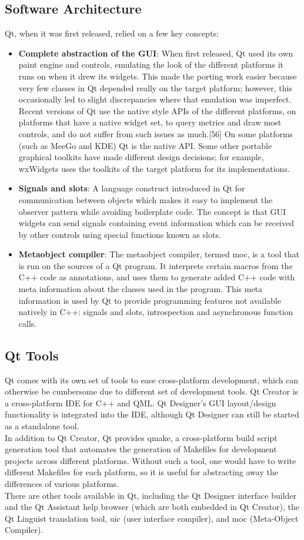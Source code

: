 \subsection{Software Architecture}
Qt, when it was first released, relied on a few key concepts:\\
\begin{itemize}
	\item \textbf{Complete abstraction of the GUI}: When first released, Qt used its own paint engine and controls, emulating the look of the different platforms it runs on when it drew its widgets. This made the porting work easier because very few classes in Qt depended really on the target platform; however, this occasionally led to slight discrepancies where that emulation was imperfect. Recent versions of Qt use the native style APIs of the different platforms, on platforms that have a native widget set, to query metrics and draw most controls, and do not suffer from such issues as much.[56] On some platforms (such as MeeGo and KDE) Qt is the native API. Some other portable graphical toolkits have made different design decisions; for example, wxWidgets uses the toolkits of the target platform for its implementations.
	\item \textbf{Signals and slots}: A language construct introduced in Qt for communication between objects which makes it easy to implement the observer pattern while avoiding boilerplate code. The concept is that GUI widgets can send signals containing event information which can be received by other controls using special functions known as slots.
	\item \textbf{Metaobject compiler}: The metaobject compiler, termed moc, is a tool that is run on the sources of a Qt program. It interprets certain macros from the C++ code as annotations, and uses them to generate added C++ code with meta information about the classes used in the program. This meta information is used by Qt to provide programming features not available natively in C++: signals and slots, introspection and asynchronous function calls.
\end{itemize}
\subsection{Qt Tools}
Qt comes with its own set of tools to ease cross-platform development, which can otherwise be cumbersome due to different set of development tools. Qt Creator is a cross-platform IDE for C++ and QML. Qt Designer's GUI layout/design functionality is integrated into the IDE, although Qt Designer can still be started as a standalone tool.\\
In addition to Qt Creator, Qt provides qmake, a cross-platform build script generation tool that automates the generation of Makefiles for development projects across different platforms. Without such a tool, one would have to write different Makefiles for each platform, so it is useful for abstracting away the differences of various platforms.\\
There are other tools available in Qt, including the Qt Designer interface builder and the Qt Assistant help browser (which are both embedded in Qt Creator), the Qt Linguist translation tool, uic (user interface compiler), and moc (Meta-Object Compiler).
